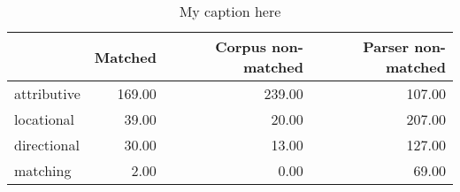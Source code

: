 \begin{table}[!ht]
\centering
\begin{tabular}{lrrr}
\toprule
{} &  Matched &  Corpus non-matched &  Parser non-matched \\
\midrule
attributive &   169.00 &              239.00 &              107.00 \\
locational  &    39.00 &               20.00 &              207.00 \\
directional &    30.00 &               13.00 &              127.00 \\
matching    &     2.00 &                0.00 &               69.00 \\
\bottomrule
\end{tabular}
\caption{My caption here}
\label{tab:RELATIONAL-oe-data}
\end{table}